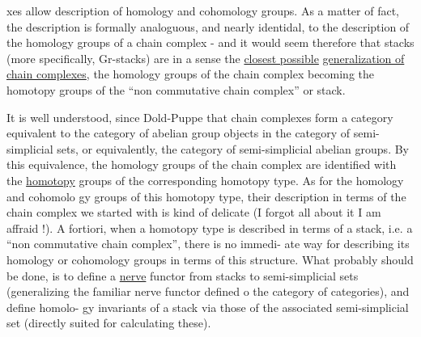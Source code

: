 
xes allow description of homology and cohomology groups.  As a matter of
fact,  the description is formally analoguous,  and nearly identidal, to
the description of the homology groups of a chain complex  -  and it
would seem therefore that stacks (more specifically,  Gr-stacks) are
in a sense the \uline{closest possible}  \uline{generalization of}  \uline{chain complexes},
the homology groups of the chain complex becoming the homotopy groups
of the ``non commutative chain complex'' or stack.

It is well understood,  since Dold-Puppe that chain complexes
form a category equivalent to the category of abelian group objects in
the category of semi-simplicial sets,  or equivalently,  the category of
semi-simplicial abelian groups.  By this equivalence,  the homology
groups of the chain complex are identified with the \uline{homotopy} groups of
the corresponding homotopy type.  As for the  homology and cohomolo%
\hand{-}gy groups of this homotopy type,  their description in terms of the
chain complex we started with is kind of delicate (I forgot all about it
I am affraid !).  A fortiori, when a homotopy type is described in terms
of a stack,  i.e. a ``non commutative chain complex'',  there is no immedi-%
ate way for describing its homology or cohomology groups  in terms of
this structure\hand{(*)}. What probably should be done,  is to define  a \uline{nerve}
functor  from stacks to semi-simplicial sets  (generalizing the familiar
nerve functor defined o the category of categories),  and define homolo-%
gy invariants of a stack via those of the associated semi-simplicial set
(directly suited for calculating these).


